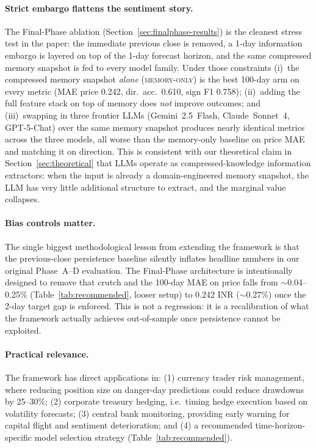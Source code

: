 \documentclass[11pt]{article}
\begin{document}
\paragraph{Strict embargo flattens the sentiment story.} The Final-Phase ablation (Section~\ref{sec:finalphase-results}) is the cleanest stress test in the paper: the immediate previous close is removed, a 1-day information embargo is layered on top of the 1-day forecast horizon, and the same compressed memory snapshot is fed to every model family. Under those constraints (i)~the compressed memory snapshot \emph{alone} (\textsc{memory-only}) is the best 100-day arm on every metric (MAE price 0.242, dir.\ acc.\ 0.610, sign F1 0.758); (ii)~adding the full feature stack on top of memory does \emph{not} improve outcomes; and (iii)~swapping in three frontier LLMs (Gemini~2.5~Flash, Claude~Sonnet~4, GPT-5-Chat) over the same memory snapshot produces nearly identical metrics across the three models, all worse than the memory-only baseline on price MAE and matching it on direction. This is consistent with our theoretical claim in Section~\ref{sec:theoretical} that LLMs operate as compressed-knowledge information extractors: when the input is already a domain-engineered memory snapshot, the LLM has very little additional structure to extract, and the marginal value collapses.

\paragraph{Bias controls matter.} The single biggest methodological lesson from extending the framework is that the previous-close persistence baseline silently inflates headline numbers in our original Phase~A--D evaluation. The Final-Phase architecture is intentionally designed to remove that crutch and the 100-day MAE on price falls from $\sim$0.04--0.25\% (Table~\ref{tab:recommended}, looser setup) to 0.242 INR ($\sim$0.27\%) once the 2-day target gap is enforced. This is not a regression: it is a recalibration of what the framework actually achieves out-of-sample once persistence cannot be exploited.

\paragraph{Practical relevance.} The framework has direct applications in: (1) currency trader risk management, where reducing position size on danger-day predictions could reduce drawdowns by 25--30\%; (2) corporate treasury hedging, i.e.\ timing hedge execution based on volatility forecasts; (3) central bank monitoring, providing early warning for capital flight and sentiment deterioration; and (4) a recommended time-horizon-specific model selection strategy (Table~\ref{tab:recommended}).
\end{document}
